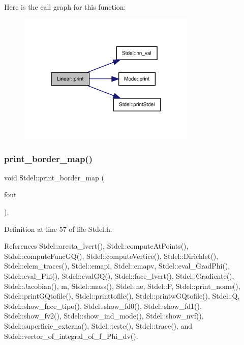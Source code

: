Here is the call graph for this function\+:
\nopagebreak
\begin{figure}[H]
\begin{center}
\leavevmode
\includegraphics[width=241pt]{classLinear_aabc086149c2ed718efe5f7be6c22f8d4_cgraph}
\end{center}
\end{figure}
\mbox{\label{classStdel_a9a0c69dca7564f6ca4aa4f3c9864ea01}} 
\subsubsection{\texorpdfstring{print\+\_\+border\+\_\+map()}{print\_border\_map()}}
{\footnotesize\ttfamily void Stdel\+::print\+\_\+border\+\_\+map (\begin{DoxyParamCaption}\item[{F\+I\+LE $\ast$}]{fout }\end{DoxyParamCaption})\hspace{0.3cm}{\ttfamily [inline]}, {\ttfamily [inherited]}}



Definition at line 57 of file Stdel.\+h.



References Stdel\+::aresta\+\_\+lvert(), Stdel\+::compute\+At\+Points(), Stdel\+::compute\+Func\+G\+Q(), Stdel\+::compute\+Vertice(), Stdel\+::\+Dirichlet(), Stdel\+::elem\+\_\+traces(), Stdel\+::emapi, Stdel\+::emapv, Stdel\+::eval\+\_\+\+Grad\+Phi(), Stdel\+::eval\+\_\+\+Phi(), Stdel\+::eval\+G\+Q(), Stdel\+::face\+\_\+lvert(), Stdel\+::\+Gradiente(), Stdel\+::\+Jacobian(), m, Stdel\+::mass(), Stdel\+::ne, Stdel\+::P, Stdel\+::print\+\_\+nome(), Stdel\+::print\+G\+Qtofile(), Stdel\+::printtofile(), Stdel\+::printw\+G\+Qtofile(), Stdel\+::Q, Stdel\+::show\+\_\+face\+\_\+tipo(), Stdel\+::show\+\_\+fd0(), Stdel\+::show\+\_\+fd1(), Stdel\+::show\+\_\+fv2(), Stdel\+::show\+\_\+ind\+\_\+mode(), Stdel\+::show\+\_\+nvf(), Stdel\+::superficie\+\_\+externa(), Stdel\+::teste(), Stdel\+::trace(), and Stdel\+::vector\+\_\+of\+\_\+integral\+\_\+of\+\_\+f\+\_\+\+Phi\+\_\+dv().

